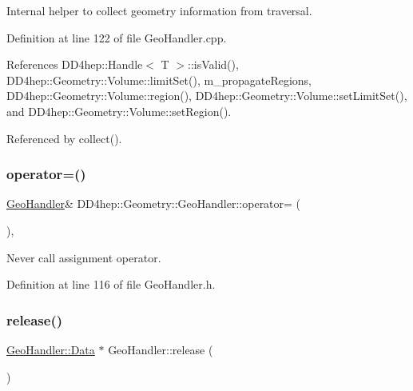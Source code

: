Internal helper to collect geometry information from traversal. 



Definition at line 122 of file Geo\+Handler.\+cpp.



References D\+D4hep\+::\+Handle$<$ T $>$\+::is\+Valid(), D\+D4hep\+::\+Geometry\+::\+Volume\+::limit\+Set(), m\+\_\+propagate\+Regions, D\+D4hep\+::\+Geometry\+::\+Volume\+::region(), D\+D4hep\+::\+Geometry\+::\+Volume\+::set\+Limit\+Set(), and D\+D4hep\+::\+Geometry\+::\+Volume\+::set\+Region().



Referenced by collect().

\hypertarget{class_d_d4hep_1_1_geometry_1_1_geo_handler_a477f807851e2177e48daa15e6d88d30e}{}\label{class_d_d4hep_1_1_geometry_1_1_geo_handler_a477f807851e2177e48daa15e6d88d30e} 
\subsubsection{\texorpdfstring{operator=()}{operator=()}}
{\footnotesize\ttfamily \hyperlink{class_d_d4hep_1_1_geometry_1_1_geo_handler}{Geo\+Handler}\& D\+D4hep\+::\+Geometry\+::\+Geo\+Handler\+::operator= (\begin{DoxyParamCaption}\item[{const \hyperlink{class_d_d4hep_1_1_geometry_1_1_geo_handler}{Geo\+Handler} \&}]{ }\end{DoxyParamCaption})\hspace{0.3cm}{\ttfamily [inline]}, {\ttfamily [private]}}



Never call assignment operator. 



Definition at line 116 of file Geo\+Handler.\+h.

\hypertarget{class_d_d4hep_1_1_geometry_1_1_geo_handler_afaa693916e577c74e90854f66123cc05}{}\label{class_d_d4hep_1_1_geometry_1_1_geo_handler_afaa693916e577c74e90854f66123cc05} 
\subsubsection{\texorpdfstring{release()}{release()}}
{\footnotesize\ttfamily \hyperlink{class_d_d4hep_1_1_geometry_1_1_geo_handler_types_a568935b7e878d3ea9fe97a2ecf33d641}{Geo\+Handler\+::\+Data} $\ast$ Geo\+Handler\+::release (\begin{DoxyParamCaption}{ }\end{DoxyParamCaption})}



